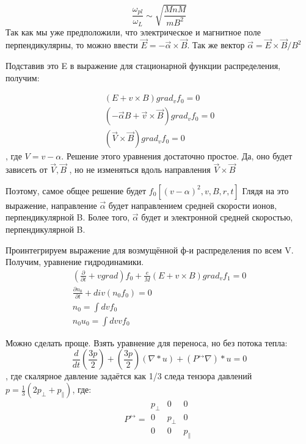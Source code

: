\documentclass[10pt, a4paper]{article}
\begin{document}
\begin{equation}
	\frac{\omega_{pl}}{\omega_{L}} \sim \sqrt{\frac{M nM}{m B^2}}
\end{equation}
Так как мы уже предположили, что электрическое и магнитное поле перпендикулярны, то можно ввести $\vec E=-\vec \alpha \times \vec B$. Так же вектор $\vec \alpha=\vec E \times \vec B /B^2$

Подставив это E в выражение для стационарной функции распределения, получим:

\begin{align*}
	(E+ v \times B) grad_v f_0 =0 	 \\
	(- \vec \alpha B + \vec v \times \vec B) grad_v f_0 =0 \\
	(\vec V \times \vec B) grad_v f_0 =0
\end{align*}
, где $V=v-\alpha$. Решение этого уравнения достаточно простое. Да, оно будет зависеть от $\vec V,\vec B$ , но не изменяться вдоль направления $\vec V \times \vec B$ 

Поэтому, самое общее решение будет $f_0 [(v-\alpha)^2,v,B,r,t]$
Глядя на это выражение, направление $\vec \alpha$ будет направлением средней скорости ионов, перпендикулярной B. Более того, $\vec \alpha$ будет и электронной средней скоростью, перпендикулярной B.

Проинтегрируем выражение для возмущённой ф-и распределения по всем V. Получим, уравнение гидродинамики.
\begin{align*}
	(\frac{\partial }{\partial t} + v grad) f_0 + \frac{e}{M}(E+v \times B) grad_v f_1  =0 \\
	\frac{\partial n_0}{\partial t} + div(n_0 f_0)  =0 \\
	n_0 = \int dv f_0 \\
	n_0  u_0=\int dv v f_0
\end{align*}


Можно сделать проще. Взять уравнение для переноса, но без потока тепла:
\begin{equation}
	\frac{d}{dt}(\frac{3p}{2})+(\frac{3p}{2})(\nabla*u) + (P^{\leftrightarrow}\nabla)*u=0
\end{equation}
, где скалярное давление задаётся как 1/3 следа тензора давлений $p= \frac{1}{3} (2p_{\perp}+p_{\parallel})$, где:
\begin{equation}
	P^{\leftrightarrow}=
	\begin{matrix}
		p_{\perp} & 0 & 0\\
		0 & p_{\perp} & 0 \\
		0 & 0 & p_{\parallel}
	\end{matrix}
\end{equation}
\end{document}
